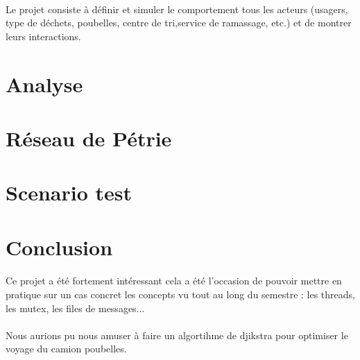 \documentclass[12pt]{article}
\begin{document}
\paragraph{}Le projet consiste à définir et simuler le comportement tous les acteurs (usagers, type de déchets, poubelles, centre de tri,service de ramassage, etc.) et de montrer leurs interactions.

\section{Analyse}
\paragraph{}


\section{Réseau de Pétrie}

\section{Scenario test}


\section{Conclusion}
\paragraph{}Ce projet a été fortement intéressant cela a été l'occasion de pouvoir mettre en pratique sur un cas concret les concepts vu tout au long du semestre : les threads, les mutex, les files de messages...

\paragraph{}Nous aurions pu nous amuser à faire un algortihme de djikstra pour optimiser le voyage du camion poubelles.
\end{document}
